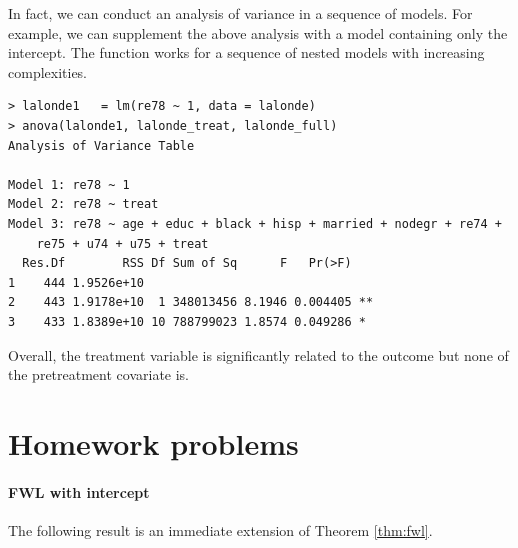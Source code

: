 In fact, we can conduct an analysis of variance in a sequence of models. For example, we can supplement the above analysis with a model containing only the intercept. The function  works for a sequence of nested models with increasing complexities. 
\begin{lstlisting}
> lalonde1   = lm(re78 ~ 1, data = lalonde)
> anova(lalonde1, lalonde_treat, lalonde_full)
Analysis of Variance Table

Model 1: re78 ~ 1
Model 2: re78 ~ treat
Model 3: re78 ~ age + educ + black + hisp + married + nodegr + re74 + 
    re75 + u74 + u75 + treat
  Res.Df        RSS Df Sum of Sq      F   Pr(>F)   
1    444 1.9526e+10                                
2    443 1.9178e+10  1 348013456 8.1946 0.004405 **
3    433 1.8389e+10 10 788799023 1.8574 0.049286 * 
\end{lstlisting}

Overall, the treatment variable is significantly related to the outcome but none of the pretreatment covariate is. 

 






\section{Homework problems}

\paragraph{FWL with intercept}\label{hw7::fwl-intercept}

The following result is an immediate extension of Theorem \ref{thm:fwl}.  

